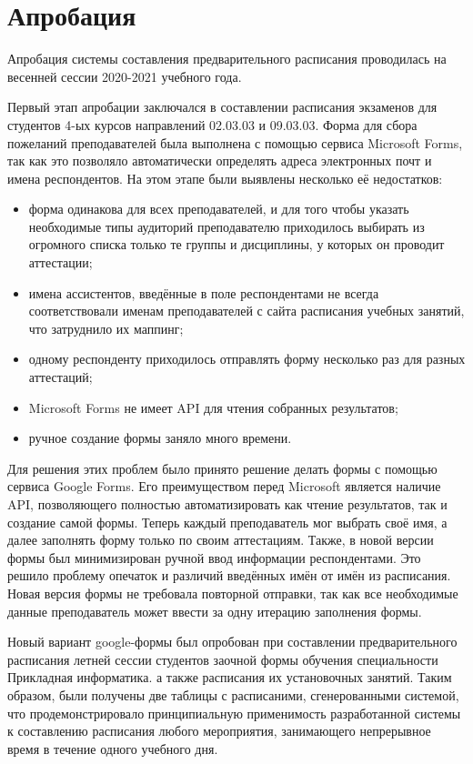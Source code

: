 \section{Апробация} \label{ch4:sec4}
Апробация системы составления предварительного расписания проводилась на весенней сессии 2020-2021 учебного года. 

Первый этап апробации заключался в составлении расписания экзаменов для студентов 4-ых курсов направлений 02.03.03 и 09.03.03. Форма для сбора пожеланий преподавателей была выполнена с помощью сервиса Microsoft Forms, так как это позволяло автоматически определять адреса электронных почт и имена респондентов. На этом этапе были выявлены несколько её недостатков:

\begin{itemize}
	\item форма одинакова для всех преподавателей, и для того чтобы указать необходимые типы аудиторий преподавателю приходилось выбирать из огромного списка только те группы и дисциплины, у которых он проводит аттестации;
	\item имена ассистентов, введённые в поле респондентами не всегда соответствовали именам преподавателей с сайта расписания учебных занятий, что затруднило их маппинг;
	\item одному респонденту приходилось отправлять форму несколько раз для разных аттестаций;
	\item Microsoft Forms не имеет API для чтения собранных результатов;
	\item ручное создание формы заняло много времени.
\end{itemize} 	

Для решения этих проблем было принято решение делать формы с помощью сервиса Google Forms. Его преимуществом перед Microsoft является наличие API, позволяющего полностью автоматизировать как чтение результатов, так и создание самой формы. Теперь каждый преподаватель мог выбрать своё имя, а далее заполнять форму только по своим аттестациям. Также, в новой версии формы был минимизирован ручной ввод информации респондентами. Это решило проблему опечаток и различий введённых имён от имён из расписания. Новая версия формы не требовала повторной отправки, так как все необходимые данные преподаватель может ввести за одну итерацию заполнения формы.

Новый вариант google-формы был опробован при составлении предварительного расписания летней сессии студентов заочной формы обучения специальности Прикладная информатика. 
а также расписания их установочных занятий. Таким образом, были получены две таблицы с расписаними, сгенерованными системой, что продемонстрировало принципиальную применимость разработанной системы к составлению расписания любого мероприятия, занимающего непрерывное время в течение одного учебного дня. 

